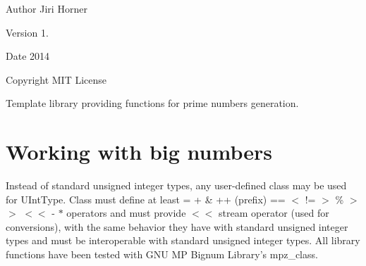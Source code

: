 \begin{DoxyAuthor}{Author}
Jiri Horner
\end{DoxyAuthor}
\begin{DoxyVersion}{Version}
1. 
\end{DoxyVersion}
\begin{DoxyDate}{Date}
2014 
\end{DoxyDate}
\begin{DoxyCopyright}{Copyright}
M\+I\+T License
\end{DoxyCopyright}
Template library providing functions for prime numbers generation.\hypertarget{index_bignums}{}\section{Working with big numbers}\label{index_bignums}
Instead of standard unsigned integer types, any user-\/defined class may be used for {\ttfamily U\+Int\+Type}. Class must define at least {\ttfamily = + \& ++ (prefix) == $<$ != $>$ \% $>$$>$ $<$$<$ -\/ $\ast$} operators and must provide $<$$<$ stream operator (used for conversions), with the same behavior they have with standard unsigned integer types and must be interoperable with standard unsigned integer types. All library functions have been tested with G\+N\+U M\+P Bignum Library's {\ttfamily mpz\+\_\+class}. 